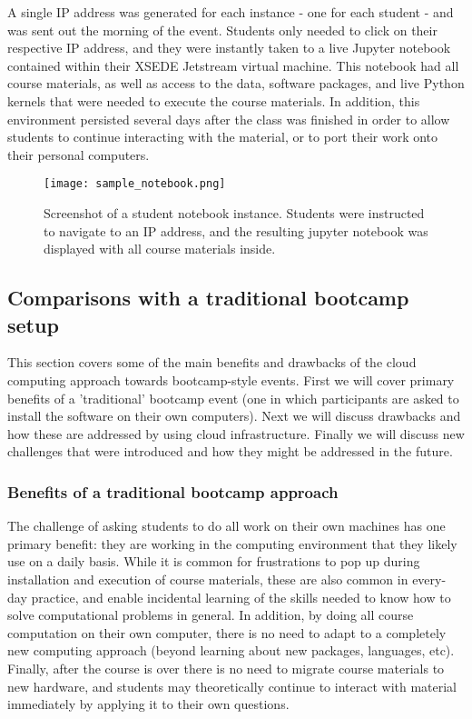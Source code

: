 \begin{enumerate}
A single IP address was generated for each instance - one
for each student - and was sent out the morning of the event. Students only
needed to click on their respective IP address, and they were instantly taken to
a live Jupyter notebook contained within their XSEDE Jetstream virtual
machine. This notebook had all course materials, as well as access to the
data, software packages, and live Python kernels that were needed to execute the
course materials. In addition, this environment persisted several days after the
class was finished in order to allow students to continue interacting with the
material, or to port their work onto their personal computers.

\end{enumerate}

\begin{figure}[h]
\centering
\texttt{[image: sample\_notebook.png]}
\caption{Screenshot of a student notebook instance. Students were instructed to
         navigate to an IP address, and the resulting jupyter notebook was
         displayed with all course materials inside.}
\end{figure}

\subsection{Comparisons with a traditional bootcamp setup}

This section covers some of the main benefits and drawbacks of the cloud
computing approach towards bootcamp-style events. First we will cover primary
benefits of a 'traditional' bootcamp event (one in which participants are asked
to install the software on their own computers). Next we will discuss drawbacks
and how these are addressed by using cloud infrastructure. Finally we will
discuss new challenges that were introduced and how they might be addressed in
the future.

\subsubsection{Benefits of a traditional bootcamp approach}

The challenge of asking students to do all work on their own machines has one
primary benefit: they are working in the computing environment that they
likely use on a daily basis. While it is common for frustrations to pop up
during installation and execution of course materials, these are also
common in every-day practice, and enable incidental learning
of the skills needed to know how to solve computational problems in general.
In addition, by doing all course computation on
their own computer, there is no need to adapt to a completely new computing
approach (beyond learning about new packages, languages, etc). Finally, after
the course is over there is no need to migrate course materials to new hardware,
and students may theoretically continue to interact with material immediately by applying
it to their own questions.

